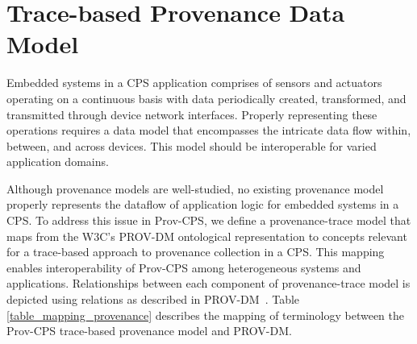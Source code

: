 \section{Trace-based Provenance Data Model} \label{prov_sensor_model}

Embedded systems in a CPS application comprises of sensors and actuators operating on a continuous basis with data periodically created, transformed, and transmitted through device network interfaces. Properly representing these operations requires a data model that encompasses the intricate data flow within, between, and across devices. This model should be interoperable for varied application domains. 


Although provenance models are well-studied, no existing provenance model properly represents the dataflow of application logic for embedded systems in a CPS. To address this issue in Prov-CPS, we define a provenance-trace model that maps from the W3C's PROV-DM ontological representation to concepts relevant for a trace-based approach to provenance collection in a CPS. This mapping enables interoperability of Prov-CPS among heterogeneous systems and applications. 
Relationships between each component of provenance-trace model is depicted using relations as described in PROV-DM~\cite{prov_dm}. Table \ref{table_mapping_provenance} describes the mapping of terminology between the Prov-CPS trace-based provenance model and PROV-DM. 


\begin{table}[!tbh] \centering 
\caption{Concept mapping from trace-based provenance to PROV-DM.}
\label{table_mapping_provenance}
\end{table}

